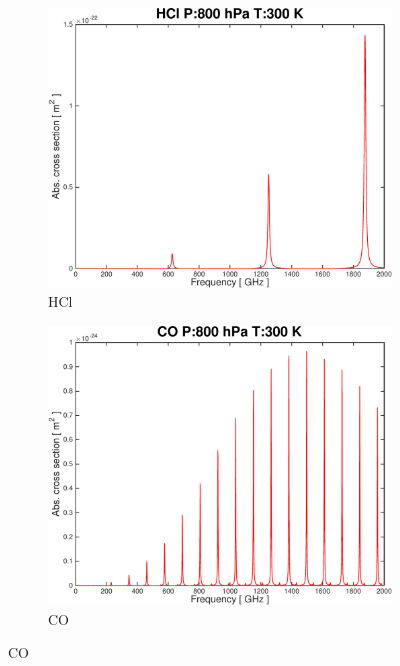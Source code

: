 \documentclass[paper=a4, fontsize=11pt]{scrartcl} %
\numberwithin{figure}{section}
\begin{document}
\begin{figure}[t!]
 \centering
 \begin{subfigure}[t]{0.45\textwidth}
 \includegraphics[width=\textwidth]{plots/plot_xsec_HCl_800hPa_300K.pdf}
 \caption{HCl}
 \end{subfigure}
 \begin{subfigure}[t]{0.45\textwidth}
 \includegraphics[width=\textwidth]{plots/plot_xsec_CO_800hPa_300K.pdf}
 \caption{CO}
 \end{subfigure}
 

\end{figure}
\end{document}
